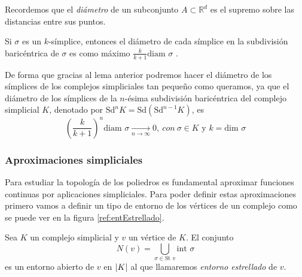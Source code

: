 Recordemos que el \emph{diámetro} de un subconjunto $A \subset \mathbb{R}^d$ es el supremo sobre las distancias entre sus puntos. 

\begin{lemma}
Si $\sigma$ es un $k$-símplice, entonces el diámetro de cada símplice en la subdivisión baricéntrica de $\sigma$ es como máximo $\frac{k}{k+1}\text{diam }\sigma$ \cite{libroEH}. 
\end{lemma}

De forma que gracias al lema anterior podremos hacer el diámetro de los símplices de los complejos simpliciales tan pequeño como queramos, ya que el diámetro de los símplices de la $n$-ésima subdivisión baricéntrica del complejo simplicial $K$, denotado por $\text{Sd}^nK = \text{Sd}(\text{Sd}^{n - 1}K)$, es 
\[
\left ( \frac{k}{k+1} \right )^n \text{diam } \sigma  \underset{n \to \infty}{\longrightarrow} 0,\ con\ \sigma \in K \text{ y } k = \text{dim } \sigma
\]

\subsubsection*{Aproximaciones simpliciales}
Para estudiar la topología de los poliedros es fundamental aproximar funciones continuas por aplicaciones simpliciales. Para poder definir estas aproximaciones primero vamos a definir un tipo de entorno de los vértices de un complejo como se puede ver en la figura \ref{ref:entEstrellado}.

\begin{definition}
Sea $K$ un complejo simplicial y $v$ un vértice de $K$. El conjunto
\[
N(v) = \bigcup_{\sigma \in \text{St } v} \text{int }\sigma
\]
es un entorno abierto de $v$ en $\lvert K\rvert$ al que llamaremos \emph{entorno estrellado} de $v$.
\end{definition}

